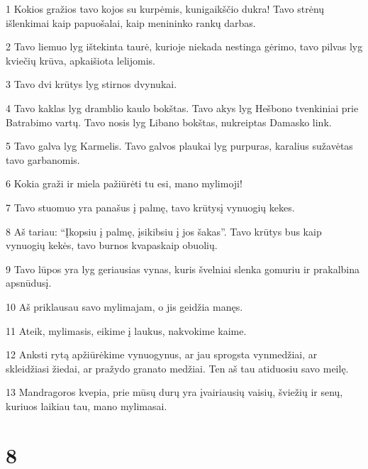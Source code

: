\par 1 Kokios gražios tavo kojos su kurpėmis, kunigaikščio dukra! Tavo strėnų išlenkimai kaip papuošalai, kaip menininko rankų darbas. 
\par 2 Tavo liemuo lyg ištekinta taurė, kurioje niekada nestinga gėrimo, tavo pilvas lyg kviečių krūva, apkaišiota lelijomis. 
\par 3 Tavo dvi krūtys lyg stirnos dvynukai. 
\par 4 Tavo kaklas lyg dramblio kaulo bokštas. Tavo akys lyg Hešbono tvenkiniai prie Batrabimo vartų. Tavo nosis lyg Libano bokštas, nukreiptas Damasko link. 
\par 5 Tavo galva lyg Karmelis. Tavo galvos plaukai lyg purpuras, karalius sužavėtas tavo garbanomis. 
\par 6 Kokia graži ir miela pažiūrėti tu esi, mano mylimoji! 
\par 7 Tavo stuomuo yra panašus į palmę, tavo krūtys­į vynuogių kekes. 
\par 8 Aš tariau: “Įkopsiu į palmę, įsikibsiu į jos šakas”. Tavo krūtys bus kaip vynuogių kekės, tavo burnos kvapas­kaip obuolių. 
\par 9 Tavo lūpos yra lyg geriausias vynas, kuris švelniai slenka gomuriu ir prakalbina apsnūdusį. 
\par 10 Aš priklausau savo mylimajam, o jis geidžia manęs. 
\par 11 Ateik, mylimasis, eikime į laukus, nakvokime kaime. 
\par 12 Anksti rytą apžiūrėkime vynuogynus, ar jau sprogsta vynmedžiai, ar skleidžiasi žiedai, ar pražydo granato medžiai. Ten aš tau atiduosiu savo meilę. 
\par 13 Mandragoros kvepia, prie mūsų durų yra įvairiausių vaisių, šviežių ir senų, kuriuos laikiau tau, mano mylimasai.



\chapter{8}


